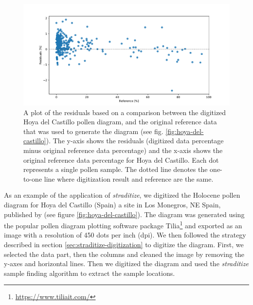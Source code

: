 \begin{refsection}
\begin{figure}
	\includegraphics[width=\linewidth]{straditize-figures/resid-plot-hoya-del-castillo.pdf}
	\caption[Residuals plot of the digitized Hoya del Castillo diagram]{A plot of the residuals based on a comparison between the digitized Hoya del Castillo pollen diagram, and the original reference data that was used to generate the diagram (see fig. \ref{fig:hoya-del-castillo}). The y-axis shows the residuals (digitized data percentage minus original reference data percentage) and the x-axis shows the original reference data percentage for Hoya del Castillo. Each dot represents a single pollen sample. The dotted line denotes the one-to-one line where digitization result and reference are the same.}
	\label{fig:hoya-resid}
\end{figure}

As an example of the application of \emph{straditize}, we digitized the Holocene pollen diagram for Hoya del Castillo (Spain) a site in Los Monegros, NE Spain, published by \cite{DavisStevenson2007} (see figure \ref{fig:hoya-del-castillo}). The diagram was generated using the popular pollen diagram plotting software package Tilia\footnote{\url{https://www.tiliait.com/}} \citep{Grimm1988, Grimm1991} and exported as an image with a resolution of 450 dots per inch (dpi). We then followed the strategy described in section \ref{sec:straditize-digitization} to digitize the diagram. First, we selected the data part, then the columns and cleaned the image by removing the y-axes and horizontal lines. Then we digitized the diagram and used the \emph{straditize} sample finding algorithm to extract the sample locations.  


\end{refsection}
